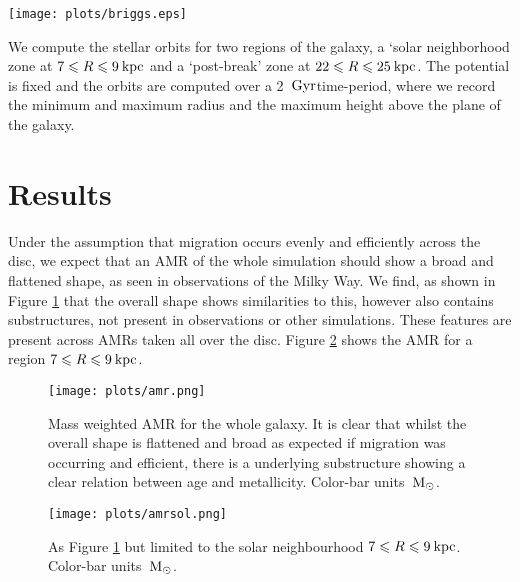 \documentclass[usenatbib, useAMS,usegraphicx]{mn2e}
\newcommand{\kpc}{\mbox{$\>{\rm kpc}$}}
\newcommand{\Gyr}{\mbox{$\>{\rm Gyr}$}}
\newcommand{\Msun}{\>{\rm M_{\odot}}}
\begin{document}
\begin{figure*}
   \centering
   \texttt{[image: plots/briggs.eps]}
   \caption{Brigg's Figures showing line-of-nodes (LON) for gas (green) and stars (red). A warp is shown between 3-5 Gyr which disappears at 6 Gyr with the disc remaining unwarped for the rest of the simulation. We can see that the gas warp generally extends further out than the stellar component and is more warped.}
   \label{fig:briggs}
\end{figure*}

We compute the stellar orbits for two regions of the galaxy, a `solar neighborhood zone at $7 \le R \le 9 \kpc$ and a `post-break' zone at $22 \le R \le 25 \kpc$. The potential is fixed and the orbits are computed over a 2 \Gyr  time-period, where we record the minimum and maximum radius and the maximum height above the plane of the galaxy.


\section{Results}\label{sec:results}

Under the assumption that migration occurs evenly and efficiently across the disc, we expect that an AMR of the whole simulation should show a broad and flattened shape, as seen in observations of the Milky Way. We find, as shown in Figure \ref{fig:AMR} that the overall shape shows similarities to this, however also contains substructures, not present in observations or other simulations. These features are present across AMRs taken all over the disc. Figure \ref{fig:AMRsol} shows the AMR for a region $7 \le R \le 9 \kpc$.

\begin{figure}
   \centering
   \texttt{[image: plots/amr.png]}
   \caption{Mass weighted AMR for the whole galaxy. It is clear that whilst the overall shape is flattened and broad as expected if migration was occurring and efficient, there is a underlying substructure showing a clear relation between age and metallicity. Color-bar units $\Msun$.}
   \label{fig:AMR}
\end{figure}

\begin{figure}
   \centering
   \texttt{[image: plots/amrsol.png]}
   \caption{As Figure \ref{fig:AMR} but limited to the solar neighbourhood  $7 \le R \le 9 \kpc$. Color-bar units $\Msun$.}
   \label{fig:AMRsol}
\end{figure}
\end{document}
